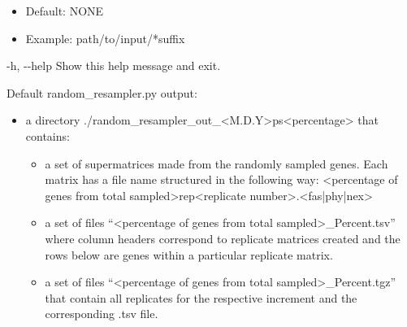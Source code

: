 \documentclass{article}
\begin{document}
\begin{description}
\begin{description}
\begin{description}
                    \begin{itemize}
                        \item Default: NONE
                        \item Example: path/to/input/*suffix
                    \end{itemize}
                    \item -h, -\/-help \hspace{0.2cm} Show this help message and exit.
                \end{description}
            \end{description}
            \vspace{0.2cm}
            \begin{description}
                \item Default random\_resampler.py output:
                \begin{itemize}
                    \item a directory ./random\_resampler\_out\_<M.D.Y>ps<percentage> that contains:
                    \begin{itemize}
                        \item a set of supermatrices made from the randomly sampled genes. Each matrix has a file name structured in the following way: <percentage of genes from total sampled>rep<replicate number>.<fas|phy|nex>
                        \item a set of files “<percentage of genes from total sampled>\_Percent.tsv” where column headers correspond to replicate matrices created and the rows below are genes within a particular replicate matrix.
                        \item a set of files “<percentage of genes from total sampled>\_Percent.tgz” that contain all replicates for the respective increment and the corresponding .tsv file.
                    \end{itemize}
                \end{itemize}
            \end{description}
        \end{description}
                        
        \vspace{0.5cm}
        
\end{document}
